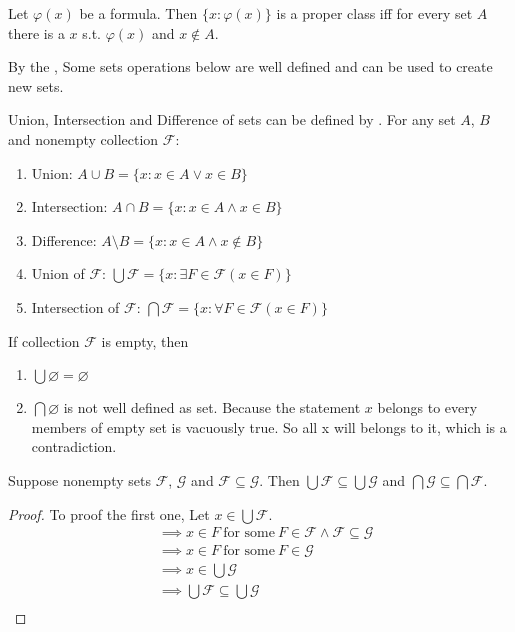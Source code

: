 \begin{corollary}{}{}
    Let $\varphi(x)$ be a formula. Then $\{x:\varphi(x)\}$ is a proper class iff for every set $A$ there is a $x$ s.t. $\varphi(x)$ and $x \notin A$.
    
\end{corollary}
By the , Some sets operations below are well defined and can be used to create new sets.

\begin{corollary}{}{}
    Union, Intersection and Difference of sets can be defined by . For any set $A$, $B$ and nonempty collection $\mathcal{F}$:\\
    \begin{enumerate}
        \item Union: $A \cup B = \{x: x \in A \lor x \in B\} $ 
        \item Intersection: $A \cap B = \{x: x \in A \land x \in B\}$
        \item Difference: $A \setminus B = \{x: x \in A \land x \notin B\}$
        \item Union of $\mathcal{F}$: $\bigcup \mathcal{F} = \{x: \exists F \in \mathcal{F}(x\in F)\}$
        \item Intersection of $\mathcal{F}$: $\bigcap \mathcal{F} = \{x: \forall F \in \mathcal{F}(x\in F)\}$
    \end{enumerate}
\end{corollary}

\begin{remark}
    If collection $\mathcal{F}$ is empty, then\\
    \begin{enumerate}
        \item $\bigcup \varnothing = \varnothing$ 
        \item $\bigcap \varnothing$ is not well defined as set. Because the statement $x$ belongs to every members of empty set is vacuously true. So all x will belongs to it, which is a contradiction.
    \end{enumerate}
\end{remark}

\begin{theorem}{}{}
    Suppose nonempty sets $\mathcal{F}$, $\mathcal{G}$ and $\mathcal{F} \subseteq \mathcal{G}$. Then $\bigcup \mathcal{F} \subseteq \bigcup \mathcal{G}$ and $\bigcap \mathcal{G} \subseteq \bigcap \mathcal{F}$.
\end{theorem}

\begin{proof}
    To proof the first one, Let $x \in \bigcup \mathcal{F}$.
    \begin{align*}
        &\implies x \in F \ \text{for some}\ F \in \mathcal{F} \land \mathcal{F} \subseteq \mathcal{G} \\
        &\implies x \in F \ \text{for some}\ F \in \mathcal{G}\\
        &\implies x \in \bigcup \mathcal{G}\\
        &\implies \bigcup \mathcal{F} \subseteq \bigcup \mathcal{G}\\
    \end{align*}
\end{proof}

